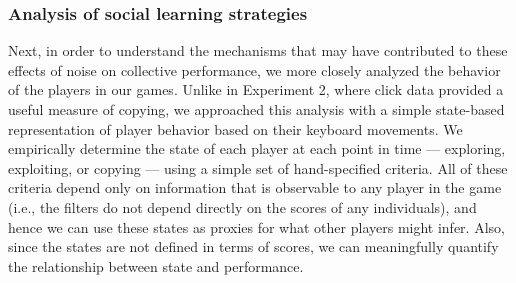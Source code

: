 \documentclass[12pt,letterpaper]{article}
\begin{document}
\subsubsection{Analysis of social learning strategies}

Next, in order to understand the mechanisms that may have contributed to these effects of noise on collective performance, we more closely analyzed the behavior of the players in our games.
Unlike in Experiment 2, where click data provided a useful measure of copying, we approached this analysis with a simple state-based representation of player behavior based on their keyboard movements.
We empirically determine the state of each player at each point in time --- exploring, exploiting, or copying --- using a simple set of hand-specified criteria.
All of these criteria depend only on information that is observable to any player in the game (i.e., the filters do not depend directly on the scores of any individuals), and hence we can use these states as proxies for what other players might infer.
Also, since the states are not defined in terms of scores, we can meaningfully quantify the relationship between state and performance.
\end{document}
